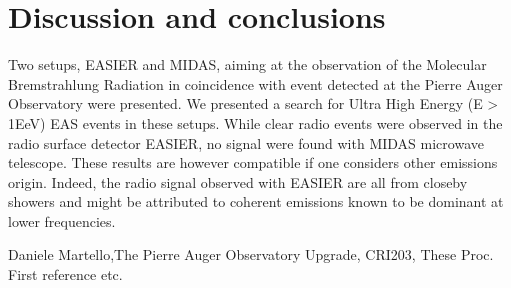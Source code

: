 \documentclass{PoS}
\begin{document}
\section{Discussion and conclusions}
Two setups, EASIER and MIDAS, aiming at the observation of the  Molecular Bremstrahlung Radiation in coincidence with event detected at the Pierre Auger Observatory were presented. We presented a search for Ultra High Energy (E > 1EeV) EAS events in these setups. While clear radio events were observed in the radio surface detector EASIER, no signal were found with MIDAS microwave telescope. These results are however compatible if one considers other emissions origin. Indeed, the radio signal observed with EASIER are all from closeby showers and might be attributed to coherent emissions known to be dominant at lower frequencies. 



\begin{thebibliography}{99}
Daniele Martello,The Pierre Auger Observatory Upgrade, CRI203, These Proc.
First reference etc.

\end{thebibliography}
\end{document}
